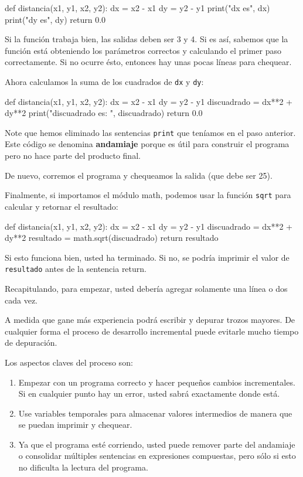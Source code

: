 \begin{pythoncode}
def distancia(x1, y1, x2, y2):
  dx = x2 - x1
  dy = y2 - y1
  print("dx es", dx)
  print("dy es", dy)
  return 0.0
\end{pythoncode}
 Si la función trabaja bien, las salidas deben ser 3 y 4. Si es así,
sabemos que la función está obteniendo los parámetros correctos y
calculando el primer paso correctamente. Si no ocurre ésto, entonces
hay unas pocas líneas para chequear.

Ahora calculamos la suma de los cuadrados de \texttt{dx} y \texttt{dy}:

\begin{pythoncode}
def distancia(x1, y1, x2, y2):
  dx = x2 - x1
  dy = y2 - y1
  discuadrado = dx**2 + dy**2
  print("discuadrado es: ", discuadrado)
  return 0.0
\end{pythoncode}
 Note que hemos eliminado las sentencias \texttt{print} que teníamos
en el paso anterior. Este código se denomina \textbf{andamiaje} porque
es útil para construir el programa pero no hace parte del producto
final.

De nuevo, corremos el programa y chequeamos la salida (que debe ser
25).

Finalmente, si importamos el módulo math, podemos usar la función
\texttt{sqrt} para calcular y retornar el resultado:

\begin{pythoncode}
def distancia(x1, y1, x2, y2):
  dx = x2 - x1
  dy = y2 - y1
  discuadrado = dx**2 + dy**2
  resultado = math.sqrt(discuadrado)
  return resultado
\end{pythoncode}
 Si esto funciona bien, usted ha terminado. Si no, se podría imprimir
el valor de \texttt{resultado} antes de la sentencia return.

Recapitulando, para empezar, usted debería agregar solamente una línea
o dos cada vez.

A medida que gane más experiencia podrá escribir y depurar trozos
mayores. De cualquier forma el proceso de desarrollo incremental puede
evitarle mucho tiempo de depuración.

Los aspectos claves del proceso son:
\begin{enumerate}
\item Empezar con un programa correcto y hacer pequeños cambios incrementales.
Si en cualquier punto hay un error, usted sabrá exactamente donde
está.
\item Use variables temporales para almacenar valores intermedios de manera
que se puedan imprimir y chequear.
\item Ya que el programa esté corriendo, usted puede remover parte del andamiaje
o consolidar múltiples sentencias en expresiones compuestas, pero
sólo si esto no dificulta la lectura del programa.
\end{enumerate}

